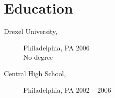 \documentclass[11pt]{article}
\begin{document}
\section*{Education}
\begin{description}
    \item[Drexel University,] Philadelphia, PA \hfill 2006  \\
        No degree
    \item[Central High School,] Philadelphia, PA \hfill 2002 -- 2006
\end{description}
\end{document}
